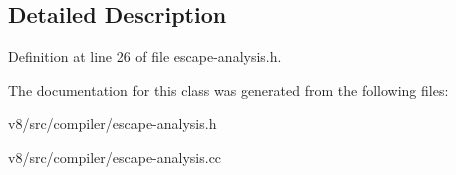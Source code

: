 \subsection{Detailed Description}


Definition at line 26 of file escape-\/analysis.\+h.



The documentation for this class was generated from the following files\+:\begin{DoxyCompactItemize}
\item 
v8/src/compiler/escape-\/analysis.\+h\item 
v8/src/compiler/escape-\/analysis.\+cc\end{DoxyCompactItemize}
